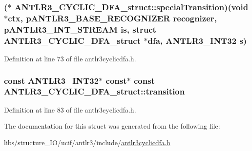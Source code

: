 \hypertarget{struct_a_n_t_l_r3___c_y_c_l_i_c___d_f_a__struct_a56f2173867a94268438aa3fdda84b7ca}{
\subsubsection[{special\-Transition}]{($\ast$ A\-N\-T\-L\-R3\-\_\-\-C\-Y\-C\-L\-I\-C\-\_\-\-D\-F\-A\-\_\-struct\-::special\-Transition)(void $\ast$ctx, {\bf p\-A\-N\-T\-L\-R3\-\_\-\-B\-A\-S\-E\-\_\-\-R\-E\-C\-O\-G\-N\-I\-Z\-E\-R} recognizer, {\bf p\-A\-N\-T\-L\-R3\-\_\-\-I\-N\-T\-\_\-\-S\-T\-R\-E\-A\-M} is, struct {\bf A\-N\-T\-L\-R3\-\_\-\-C\-Y\-C\-L\-I\-C\-\_\-\-D\-F\-A\-\_\-struct} $\ast$dfa, {\bf A\-N\-T\-L\-R3\-\_\-\-I\-N\-T32} {\bf s})}}\label{struct_a_n_t_l_r3___c_y_c_l_i_c___d_f_a__struct_a56f2173867a94268438aa3fdda84b7ca}


Definition at line 73 of file antlr3cyclicdfa.\-h.

\hypertarget{struct_a_n_t_l_r3___c_y_c_l_i_c___d_f_a__struct_a3a21fd1331a5610e606624920974b3ae}{
\subsubsection[{transition}]{\setlength{\rightskip}{0pt plus 5cm}const {\bf A\-N\-T\-L\-R3\-\_\-\-I\-N\-T32}$\ast$ const$\ast$ const A\-N\-T\-L\-R3\-\_\-\-C\-Y\-C\-L\-I\-C\-\_\-\-D\-F\-A\-\_\-struct\-::transition}}\label{struct_a_n_t_l_r3___c_y_c_l_i_c___d_f_a__struct_a3a21fd1331a5610e606624920974b3ae}


Definition at line 83 of file antlr3cyclicdfa.\-h.



The documentation for this struct was generated from the following file\-:\begin{DoxyCompactItemize}
\item 
libs/structure\-\_\-\-I\-O/ucif/antlr3/include/\hyperlink{antlr3cyclicdfa_8h}{antlr3cyclicdfa.\-h}\end{DoxyCompactItemize}
